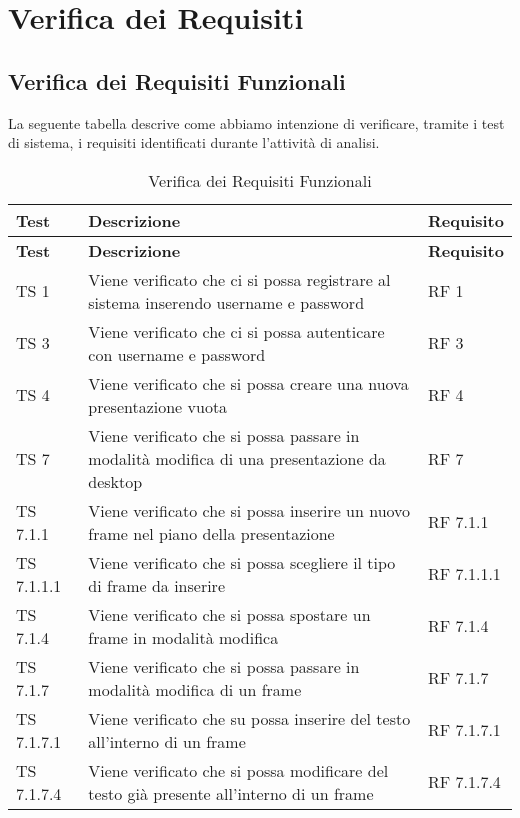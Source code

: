 \section{Verifica dei Requisiti}{
\subsection{Verifica dei Requisiti Funzionali}{
	La seguente tabella descrive come abbiamo intenzione di verificare, tramite i test di sistema, i requisiti identificati durante l'attività di analisi.
	
		\renewcommand*{\arraystretch}{1.4}
		\begin{longtable} [c]{| p{3cm} | p{6cm} |p{3cm}|}
			\caption{Verifica dei Requisiti Funzionali \label{tab:verReqFunz}}\\
			 \hline
			 \textbf{Test} & \textbf{Descrizione} & \textbf{Requisito} \\
			 \hline
			 \endfirsthead
			 \hline
			 \textbf{Test} & \textbf{Descrizione} & \textbf{Requisito} \\
			 \hline
			\endhead
			 \hline
			 \endfoot
			 \hline
			 \endlastfoot
			TS 1 & Viene verificato che ci si possa registrare al sistema inserendo username e password & RF 1\\
			\hline
			TS 3 & Viene verificato che ci si possa autenticare con username e password & RF 3\\
			\hline
			TS 4 & Viene verificato che si possa creare una nuova presentazione vuota & RF 4\\
			\hline
			TS 7 & Viene verificato che si possa passare in modalità modifica di una presentazione da desktop\ped{g} & RF 7\\
			\hline
			TS 7.1.1 & Viene verificato che si possa inserire un nuovo frame\ped{g} nel piano della presentazione\ped{g} & RF 7.1.1\\
			\hline
			TS 7.1.1.1 & Viene verificato che si possa scegliere il tipo di frame\ped{g} da inserire & RF 7.1.1.1\\
			\hline
			TS 7.1.4 & Viene verificato che si possa spostare un frame\ped{g} in modalità modifica & RF 7.1.4\\
			\hline
			TS 7.1.7 & Viene verificato che si possa passare in modalità modifica di un frame\ped{g} & RF 7.1.7\\
			\hline
			TS 7.1.7.1 & Viene verificato che su possa inserire del testo all'interno di un frame\ped{g} & RF 7.1.7.1\\
			\hline
			TS 7.1.7.4 & Viene verificato che si possa modificare del testo già presente all'interno di un frame\ped{g} & RF 7.1.7.4\\

\end{longtable}}}
